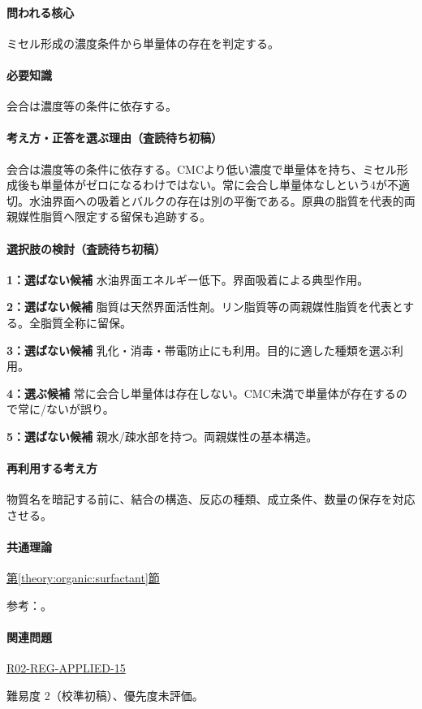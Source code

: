 \paragraph{問われる核心} ミセル形成の濃度条件から単量体の存在を判定する。

\paragraph{必要知識} 会合は濃度等の条件に依存する。

\paragraph{考え方・正答を選ぶ理由（査読待ち初稿）} 会合は濃度等の条件に依存する。CMCより低い濃度で単量体を持ち、ミセル形成後も単量体がゼロになるわけではない。常に会合し単量体なしという4が不適切。水油界面への吸着とバルクの存在は別の平衡である。原典の脂質を代表的両親媒性脂質へ限定する留保も追跡する。

\paragraph{選択肢の検討（査読待ち初稿）}\mbox{}\par

\noindent\textbf{1：選ばない候補} 水油界面エネルギー低下。界面吸着による典型作用。\par

\noindent\textbf{2：選ばない候補} 脂質は天然界面活性剤。リン脂質等の両親媒性脂質を代表とする。全脂質全称に留保。\par

\noindent\textbf{3：選ばない候補} 乳化・消毒・帯電防止にも利用。目的に適した種類を選ぶ利用。\par

\noindent\textbf{4：選ぶ候補} 常に会合し単量体は存在しない。CMC未満で単量体が存在するので常に/ないが誤り。\par

\noindent\textbf{5：選ばない候補} 親水/疎水部を持つ。両親媒性の基本構造。\par

\paragraph{再利用する考え方} 物質名を暗記する前に、結合の構造、反応の種類、成立条件、数量の保存を対応させる。

\paragraph{共通理論} \hyperref[theory:organic:surfactant]{第\ref*{theory:organic:surfactant}節}

\par 参考：\cite{organic_cmc}。

\paragraph{関連問題} \hyperref[q:r02-reg-applied-15]{R02-REG-APPLIED-15}

\par 難易度 2（校準初稿）、優先度未評価。
